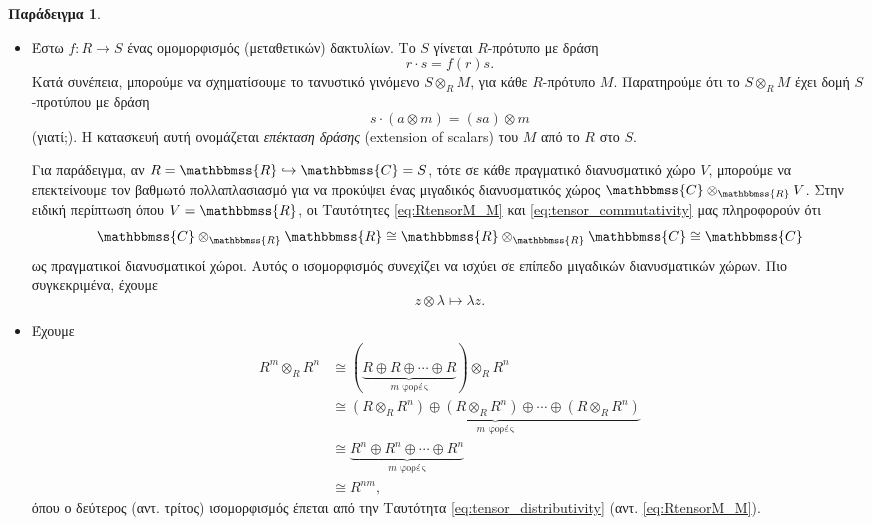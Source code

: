 \documentclass[12pt,a4paper,reqno]{amsart}
\theoremstyle{definition}
\newtheorem{example}[theorem]{Παράδειγμα}
\theoremstyle{remark}
\numberwithin{theorem}{section}
\numberwithin{exercise}{section}
\numberwithin{equation}{section}
\newcommand{\RR}{\mathbbmss{R}}
\newcommand{\CC}{\mathbbmss{C}}
\renewcommand{\to}{\rightarrow}
\begin{document}
\begin{example}
\begin{itemize}
        \item[(στ)] Έστω $f : R \to S$ ένας ομομορφισμός (μεταθετικών) δακτυλίων. Το $S$ γίνεται $R$-πρότυπο με δράση 
        \[
        r \cdot s = f(r)s.
        \]
        Κατά συνέπεια, μπορούμε να σχηματίσουμε το τανυστικό γινόμενο $S \otimes_R M$, για κάθε $R$-πρότυπο $M$. Παρατηρούμε ότι το $S \otimes_R M$ έχει δομή $S$-προτύπου με δράση 
        \[
        s \cdot (a \otimes m) = (sa) \otimes m
        \]
        (γιατί;). Η κατασκευή αυτή ονομάζεται \emph{επέκταση δράσης} (extension of scalars) του $M$ από το $R$ στο $S$.

        Για παράδειγμα, αν $R = \RR \hookrightarrow \CC = S$, τότε σε κάθε πραγματικό διανυσματικό χώρο $V$, μπορούμε να επεκτείνουμε τον βαθμωτό πολλαπλασιασμό για να προκύψει ένας μιγαδικός διανυσματικός χώρος $\CC \otimes_\RR V$. Στην ειδική περίπτωση όπου $V = \RR$, οι Ταυτότητες \eqref{eq:RtensorM_M} και \eqref{eq:tensor_commutativity} μας πληροφορούν ότι 
        \[
        \CC \otimes_\RR \RR \cong \RR \otimes_\RR \CC \cong \CC
        \]
        ως πραγματικοί διανυσματικοί χώροι. Αυτός ο ισομορφισμός συνεχίζει να ισχύει σε επίπεδο μιγαδικών διανυσματικών χώρων. Πιο συγκεκριμένα, έχουμε 
        \[
        z \otimes \lambda \mapsto \lambda{z}.
        \]

        \item[(ζ)] Έχουμε 
        \begin{align*}
            R^m \otimes_R R^n &\cong  
            \left(
                \underbrace{R \oplus R \oplus \cdots \oplus R}_{\text{$m$ φορές}}
            \right) \otimes_R R^n \\
            &\cong \underbrace{\left(R\otimes_R R^n\right) \oplus \left(R\otimes_R R^n\right) \oplus \cdots \oplus \left(R\otimes_R R^n\right)}_{\text{$m$ φορές}} \\ 
            &\cong \underbrace{R^n \oplus R^n \oplus \cdots \oplus R^n}_{\text{$m$ φορές}} \\ 
            &\cong R^{nm},
        \end{align*}
        όπου ο δεύτερος (αντ. τρίτος) ισομορφισμός έπεται από την Ταυτότητα \eqref{eq:tensor_distributivity} (αντ. \eqref{eq:RtensorM_M}).
    \end{itemize}
\end{example}



\end{document}
